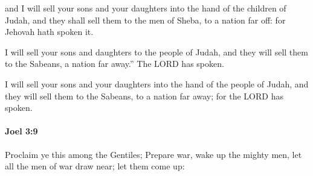 			\begin{versebox}
					\item[BHS] 
					\item[LXX] 
					\item[ASV] and I will sell your sons and your daughters into the hand of the children of Judah, and they shall sell them to the men of Sheba, to a nation far off: for Jehovah hath spoken it.
					\item[NIV] I will sell your sons and daughters to the people of Judah, and they will sell them to the Sabeans, a nation far away.” The LORD has spoken.
					\item[NRSV] I will sell your sons and your daughters into the hand of the people of Judah, and they will sell them to the Sabeans, to a nation far away; for the LORD has spoken.
			\end{versebox}

		\paragraph{Joel 3:9} %
			\label{JOEL-3-9}

			Proclaim ye this among the Gentiles; Prepare war, wake up the mighty men, let all the men of war draw near; let them come up:

